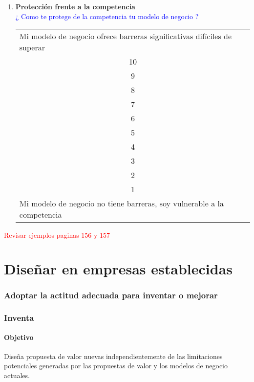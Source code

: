 \documentclass[11pt]{book}
\begin{document}
\begin{enumerate}
\item \textbf{ Protección frente a la competencia }\\
\textcolor{blue}{¿ Como te protege de la competencia tu modelo de negocio ?}
\begin{table}[htbp]
  \centering

    \begin{tabular}{p{12.43em}}
    Mi modelo de negocio ofrece barreras significativas difíciles de superar \\
    \multicolumn{1}{c}{10} \\
    \multicolumn{1}{c}{9} \\
    \multicolumn{1}{c}{8} \\
    \multicolumn{1}{c}{7} \\
    \multicolumn{1}{c}{6} \\
    \multicolumn{1}{c}{5} \\
    \multicolumn{1}{c}{4} \\
    \multicolumn{1}{c}{3} \\
    \multicolumn{1}{c}{2} \\
    \multicolumn{1}{c}{1} \\
    Mi modelo de negocio no tiene barreras, soy vulnerable a la competencia \\
    \end{tabular}%
  \label{tab:addlabel}%
\end{table}%

\end{enumerate}
\textcolor{red}{Revisar ejemplos paginas 156 y 157}
\section{Diseñar en empresas establecidas}
\subsubsection{Adoptar la actitud adecuada para inventar o mejorar}
\subsubsection{Inventa}
\paragraph{Objetivo}
Diseña propuesta de valor nuevas independientemente de las limitaciones potenciales generadas por las propuestas de valor y los modelos de negocio actuales.
\end{document}
